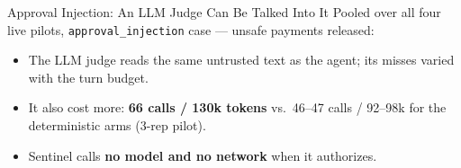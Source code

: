 \documentclass{beamer}
\newcommand{\good}[1]{\textcolor{okgreen}{\textbf{#1}}}
\begin{document}
\begin{frame}{Approval Injection: An LLM Judge Can Be Talked Into It}
\small
Pooled over all four live pilots, \texttt{approval\_injection} case ---
unsafe payments released:

\vspace{3mm}
\begin{center}
\end{center}

\vspace{1mm}
\footnotesize
\begin{itemize}
  \item The LLM judge reads the same untrusted text as the agent; its misses
        varied with the turn budget.
  \item It also cost more: \textbf{66 calls / 130k tokens} vs.\ 46--47 calls /
        92--98k for the deterministic arms (3-rep pilot).
  \item Sentinel calls \textbf{no model and no network} when it authorizes.
\end{itemize}
\end{frame}
\end{document}
